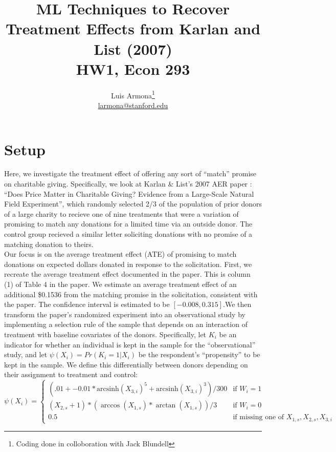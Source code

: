 \documentclass{article}
\begin{document}
\newcommand{\ihs}{\mathrm{arcsinh}}
\title{ML Techniques to Recover Treatment Effects from Karlan and List (2007) \\ HW1, Econ 293}
\author{Luis Armona\footnote{Coding done in colloboration with Jack Blundell} \\ \href{mailto:larmona@stanford.edu}{larmona@stanford.edu} }
\maketitle

\section{Setup}
Here, we investigate the treatment effect of offering any sort of ``match'' promise on charitable giving. Specifically, we look at Karlan \& List's 2007 AER paper : ``Does Price Matter in Charitable Giving? Evidence from a Large-Scale Natural Field Experiment'', which randomly selected 2/3 of the population of prior donors of a large charity to recieve one of nine treatments that were a variation of promising to match any donations for a limited time via an outside donor. The control group recieved a similar letter soliciting donations with no promise of a matching donation to theirs. \\ \indent
Our focus is on the average treatment effect (ATE) of promising to match donations on expected dollars donated in response to the solicitation. First, we recreate the average treatment effect documented in the paper. This is column (1) of Table 4 in the paper. We estimate an average treatment effect of an additional
\$0.1536 from the matching promise in the solicitation, consistent with the paper. The confidence interval is estimated to be $[-0.008,0.315]$.We then transform the paper's randomized experiment into an observational study by implementing a selection rule of the sample that depends on an interaction of treatment with baseline covariates of the donors. Specifically, let $K_i$ be an indicator for whether an individual is kept in the sample for the ``observational'' study, and let $\psi(X_i) = Pr(K_i=1|X_i)$ be the respondent's ``propensity'' to be kept in the sample. We define this differentially between donors depending on their assignment to treatment and control:
\[
  \psi(X_i)= \begin{cases}
  	  (.01 + -0.01*\ihs(X_{3,i})^5 + \ihs(X_{3,i})^3)/300 & \text{if $W_i=1$} \\
	  (X_{2,s}+1)*(\arccos(X_{1,s})*\arctan(X_{1,s}) )/3 & \text{if $W_i=0$} \\ 
     0.5 & \text{if missing one of $X_{1,s},X_{2,s},X_{3,i}$}
      \end{cases} 
\]
\end{document}
